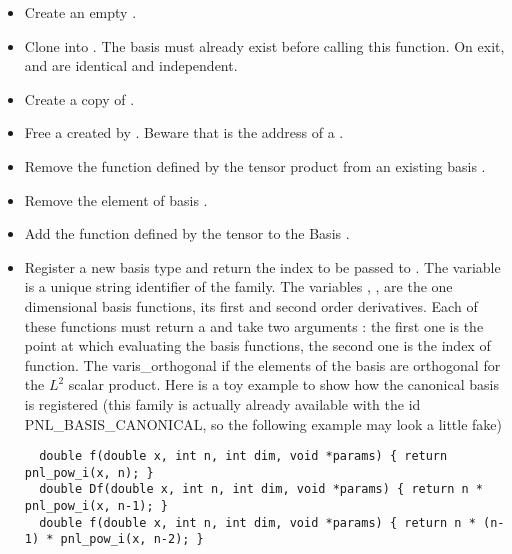 \begin{itemize}

\item {}
  \sshortdescribe Create an empty \PnlBasis.

\item {}
  \sshortdescribe Clone  into . The basis  must
  already exist before calling this function. On exit,  and 
  are identical and independent.
\item {}
  \sshortdescribe Create a copy of .

\item  {}
  \sshortdescribe Free a \PnlBasis created by
  . Beware that  is the address of a
  \PnlBasis\ptr.

\item {}
  \sshortdescribe Remove the function defined by the tensor product  from
  an existing basis .

\item {}
  \sshortdescribe Remove the  element of basis .

\item {}
  \sshortdescribe Add the function defined by the tensor  to the Basis .

\item {}
\sshortdescribe Register a new basis type and return the index to be passed to
. The variable  is a unique
string identifier of the family. The variables , ,  are
the one dimensional basis functions, its first and second order derivatives.
Each of these functions must return a  and take two arguments : the
first one is the point at which evaluating the basis functions, the second one
is the index of function. The var{is_orthogonal} if the elements of the basis are orthogonal for the $L^2$ scalar product. Here is a toy example to show how the canonical basis
is registered (this family is actually already available with the id
PNL_BASIS_CANONICAL, so the following example may look a little fake)
\begin{lstlisting}
  double f(double x, int n, int dim, void *params) { return pnl_pow_i(x, n); }
  double Df(double x, int n, int dim, void *params) { return n * pnl_pow_i(x, n-1); }
  double f(double x, int n, int dim, void *params) { return n * (n-1) * pnl_pow_i(x, n-2); }


\end{lstlisting}
\end{itemize}
